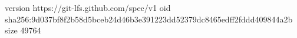 version https://git-lfs.github.com/spec/v1
oid sha256:9d037bf8f2b58d5bceb24d46b3e391223dd52379dc8465edff2fddd409844a2b
size 49764
